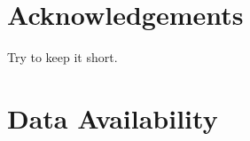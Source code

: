 \documentclass[letters,usenatbib,times]{mnras}
\begin{document}
\section*{Acknowledgements}

Try to keep it short.

\section*{Data Availability}











\bsp	%
\label{lastpage}
\end{document}
